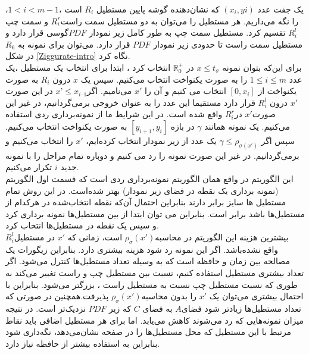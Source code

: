 یک جفت عدد $(x_{i},y{i})$ که نشان‌دهنده گوشه پایین مستطیل $R_{i}$ است ،$1< i < m - 1$، را نگه می‌داریم. 
هر مستطیل را می‌توان به دو مستطیل  سمت راست$ R^{r}_{i}$ و  سمت چپ$ R^{l}_{i}$ تقسیم کرد. مستطیل سمت چپ به طور کامل زیر نمودار $PDF$گوسی قرار دارد و مستطیل سمت راست تا حدودی زیر نمودار $PDF$  قرار دارد. می‌توان برای نمونه به $R_{6}$  در شکل \ref{Ziggurate-intro} نگاه کرد.
\\
برای این‌که بتوان نمونه $x \leq t_{\sigma}$  در $\mathbb{R}^{+}_{0}$  انتخاب کرد ، ابتدا برای انتخاب یک مستطیل ،یک عدد $1 \leq i \leq m$ را به صورت یکنواخت انتخاب می‌کنیم.  سپس یک $ x$  درون $R_{i}$ به صورت یکنواخت  از  $[0, x_{i}]$ انتخاب می کنیم  و آن را $x'$  می‌نامیم. اگر$ x’\leq   x_{i – 1}$   در این صورت  $x'$   درون $ R^{l}_{i}$ قرار دارد مستقیما این عدد را به عنوان خروجی برمی‌گردانیم، در غیر این صورت$x'$  در$ R^{r}_{i}$ واقع شده است. در این شرایط ما از نمونه‌برداری ردی استفاده می‌کنیم. یک نمونه همانند $\gamma$  در بازه $ [y_{i+1}, y_{i}]$ به صورت یکنواخت انتخاب می‌کنیم. سپس اگر $\gamma \leq \rho _{\sigma (x')}$ یک عدد از زیر نمودار انتخاب کرده‌ایم،   $x'$ را انتخاب می‌کنیم و برمی‌گردانیم. در غیر این صورت نمونه را رد می کنیم و دوباره تمام مراحل را  با نمونه‌ جدید $i$  تکرار می‌کنیم.
\\
این الگوریتم در واقع همان الگوریتم نمونه‌برداری ردی است که قسمت اول الگوریتم (نمونه برداری یک نقطه در فضای زیر نمودار) بهتر شده‌است. در این روش تمام مستطیل ها سایز برابر دارند بنابراین احتمال آن‌که نقطه انتخاب‌شده در هرکدام از  مستطیل‌ها باشد برابر است. بنابراین می توان ابتدا از بین مستطیل‌ها نمونه برداری کرد و سپس یک نقطه در مستطیل‌ها انتخاب کرد.
\\
بیشترین هزینه این الگوریتم‌ در محاسبه$\rho_{\sigma}(x')$  است، زمانی که  $x'$ در مستطیل$ R^{l}_{i}$ واقع نشده‌باشد.  اگر این نمونه رد شود هزینه بیشتری دارد. بنابراین زیگورات یک مصالحه بین زمان و حافظه است که به وسیله تعداد مستطیل‌ها کنترل می‌شود. اگر تعداد بیشتری مستطیل استفاده کنیم، نسبت بین مستطیل  چپ و راست تغییر می‌کند به طوری که نسبت مستطیل چپ نسبت به مستطیل راست ، بزرگتر می‌شود. بنابراین با احتمال بیشتری می‌توان  یک $x'$ را بدون محاسبه$\rho_{\sigma}(x')$    پذیرفت.همچنین در صورتی که تعداد مستطیل‌ها زیادتر شود فضای$ A$  به فضای $C$   که زیر $PDF$ نزدیک‌تر است. در نتیجه میزان نمونه‌‌هایی که رد می‌شوند کاهش می‌یابد. اما برای هر مستطیل اضافی باید نقاط مرتبط با این مستطیل  که محل مستطیل‌ها را در  صفحه نشان‌می‌دهد، نگه‌داری شود بنابراین به استفاده بیشتر از حافظه نیاز دارد.
